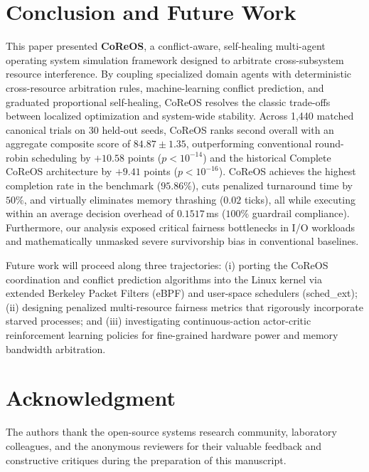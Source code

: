 \documentclass[conference]{IEEEtran}
\begin{document}
\section{Conclusion and Future Work}
\label{sec:conclusion}
This paper presented \textbf{CoReOS}, a conflict-aware, self-healing multi-agent operating system simulation framework designed to arbitrate cross-subsystem resource interference. By coupling specialized domain agents with deterministic cross-resource arbitration rules, machine-learning conflict prediction, and graduated proportional self-healing, CoReOS resolves the classic trade-offs between localized optimization and system-wide stability. Across 1,440 matched canonical trials on 30 held-out seeds, CoReOS ranks second overall with an aggregate composite score of $84.87 \pm 1.35$, outperforming conventional round-robin scheduling by $+10.58$ points ($p < 10^{-14}$) and the historical Complete CoReOS architecture by $+9.41$ points ($p < 10^{-16}$). CoReOS achieves the highest completion rate in the benchmark ($95.86\%$), cuts penalized turnaround time by $50\%$, and virtually eliminates memory thrashing ($0.02$ ticks), all while executing within an average decision overhead of $0.1517$\,ms ($100\%$ guardrail compliance). Furthermore, our analysis exposed critical fairness bottlenecks in I/O workloads and mathematically unmasked severe survivorship bias in conventional baselines.

Future work will proceed along three trajectories: (i) porting the CoReOS coordination and conflict prediction algorithms into the Linux kernel via extended Berkeley Packet Filters (eBPF) and user-space schedulers (sched\_ext); (ii) designing penalized multi-resource fairness metrics that rigorously incorporate starved processes; and (iii) investigating continuous-action actor-critic reinforcement learning policies for fine-grained hardware power and memory bandwidth arbitration.

\section*{Acknowledgment}
The authors thank the open-source systems research community, laboratory colleagues, and the anonymous reviewers for their valuable feedback and constructive critiques during the preparation of this manuscript.




\balance

\appendices
\end{document}
